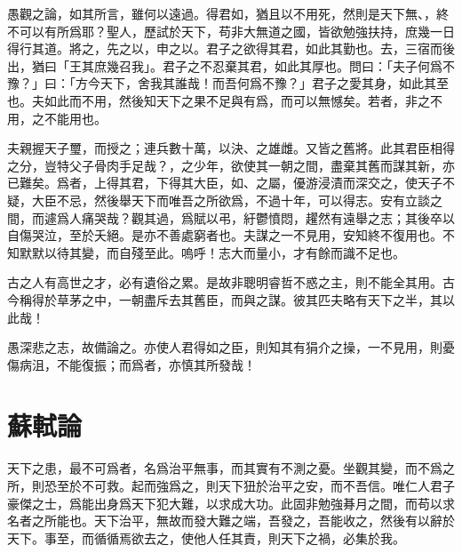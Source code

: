 愚觀之論，如其所言，雖何以遠過。得君如，猶且以不用死，然則是天下無、，終不可以有所爲耶？聖人，歷試於天下，苟非大無道之國，皆欲勉強扶持，庶幾一日得行其道。將之，先之以，申之以。君子之欲得其君，如此其勤也。去，三宿而後出，猶曰「王其庶幾召我」。君子之不忍棄其君，如此其厚也。問曰：「夫子何爲不豫？」曰：「方今天下，舍我其誰哉！而吾何爲不豫？」君子之愛其身，如此其至也。夫如此而不用，然後知天下之果不足與有爲，而可以無憾矣。若者，非之不用，之不能用也。%

夫親握天子璽，而授之；連兵數十萬，以決、之雄雌。又皆之舊將。此其君臣相得之分，豈特父子骨肉手足哉？，之少年，欲使其一朝之間，盡棄其舊而謀其新，亦已難矣。爲者，上得其君，下得其大臣，如、之屬，優游浸漬而深交之，使天子不疑，大臣不忌，然後舉天下而唯吾之所欲爲，不過十年，可以得志。安有立談之間，而遽爲人痛哭哉？觀其過，爲賦以弔，{紆鬱憤悶}，趯然有遠舉之志；其後卒以自傷哭泣，至於夭絕。是亦不善處窮者也。夫謀之一不見用，安知終不復用也。不知默默以待其變，而自殘至此。嗚呼！志大而量小，才有餘而識不足也。%

古之人有高世之才，必有遺俗之累。是故非聰明睿哲不惑之主，則不能全其用。古今稱得於草茅之中，一朝盡斥去其舊臣，而與之謀。彼其匹夫略有天下之半，其以此哉！

愚深悲之志，故備論之。亦使人君得如之臣，則知其有狷介之操，一不見用，則憂傷病沮，不能復振；而爲者，亦慎其所發哉！%

\theendnotes

\section[鼂錯論\quad{\small 蘇軾}]{{\normalsize 蘇軾}\quad{}論}
天下之患，最不可爲者，名爲治平無事，而其實有不測之憂。坐觀其變，而不爲之所，則恐至於不可救。起而強爲之，則天下狃於治平之安，而不吾信。唯仁人君子豪傑之士，爲能出身爲天下犯大難，以求成大功。此固非勉強朞月之間，而苟以求名者之所能也。天下治平，無故而發大難之端，吾發之，吾能收之，然後有{以}辭於天下。事至，而循循焉欲去之，使他人任其責，則天下之禍，必集於我。%

